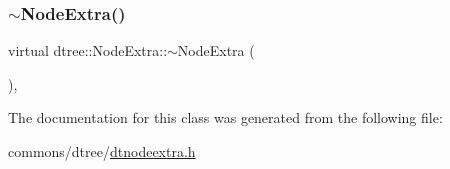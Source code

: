 \mbox{\label{classdtree_1_1_node_extra_aa28add6fabeb46077f85e983b3682816}} 
\subsubsection{\texorpdfstring{$\sim$NodeExtra()}{~NodeExtra()}}
{\footnotesize\ttfamily virtual dtree\+::\+Node\+Extra\+::$\sim$\+Node\+Extra (\begin{DoxyParamCaption}{ }\end{DoxyParamCaption})\hspace{0.3cm}{\ttfamily [inline]}, {\ttfamily [virtual]}}



The documentation for this class was generated from the following file\+:\begin{DoxyCompactItemize}
\item 
commons/dtree/\mbox{\hyperlink{dtnodeextra_8h}{dtnodeextra.\+h}}\end{DoxyCompactItemize}
